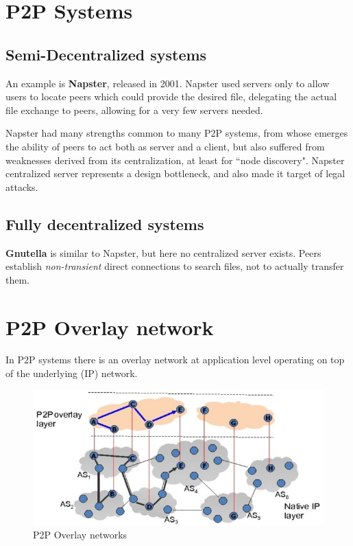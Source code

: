 \section{P2P Systems}
\subsection{Semi-Decentralized systems}
An example is \textbf{Napster}, released in 2001.
Napster used servers only to allow users to locate peers which could provide the desired file, delegating the actual file exchange to peers, allowing for a very few servers needed.


Napster had many strengths common to many P2P systems, from whose emerges the ability of peers to act both as server and a client, but also suffered from weaknesses derived from its centralization, at least for ``node discovery".
Napster centralized server represents a design bottleneck, and also made it target of legal attacks.

\subsection{Fully decentralized systems}
\textbf{Gnutella} is similar to Napster, but here no centralized server exists.
Peers establish \textit{non-transient} direct connections to search files, not to actually transfer them.



\section{P2P Overlay network}
In P2P systems there is an overlay network at application level operating on top of the underlying (IP) network.
\begin{figure}[htbp]
   \centering
   \includegraphics{images/P2Poverlay.png}
   \caption{P2P Overlay networks}
   \label{fig:P2Poverlay}
\end{figure}

